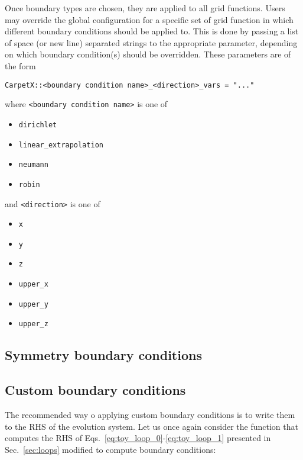   Once boundary types are chosen, they are applied to all grid functions. Users may override the global configuration for a specific set of grid function in which different boundary conditions should be applied to. This is done by passing a list of space (or new line) separated strings to the appropriate parameter, depending on which boundary condition(s) should be overridden. These parameters are of the form
%
  \begin{center}
    \texttt{CarpetX::<boundary condition name>\_<direction>\_vars = "..."}
  \end{center}
%
where \texttt{<boundary condition name>} is one of
%
\begin{itemize}
  \item \texttt{dirichlet}
  \item \texttt{linear\_extrapolation}
  \item \texttt{neumann}
  \item \texttt{robin}
\end{itemize}
%
and \texttt{<direction>} is one of
\begin{itemize}
  \item \texttt{x}
  \item \texttt{y}
  \item \texttt{z}
  \item \texttt{upper\_x}
  \item \texttt{upper\_y}
  \item \texttt{upper\_z}
\end{itemize}


\subsection{Symmetry boundary conditions}

\subsection{Custom boundary conditions}

The recommended way o applying custom boundary conditions is to write them to the RHS of the evolution system. Let us once again consider the function that computes the RHS of Eqs.~\eqref{eq:toy_loop_0}-\eqref{eq:toy_loop_1} presented in Sec.~\ref{sec:loops} modified to compute boundary conditions:

